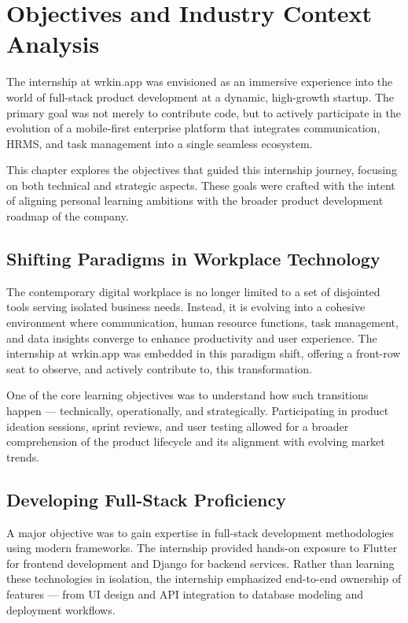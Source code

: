 \chapter{Objectives and Industry Context Analysis}

The internship at wrkin.app was envisioned as an immersive experience into the world of full-stack product development at a dynamic, high-growth startup. The primary goal was not merely to contribute code, but to actively participate in the evolution of a mobile-first enterprise platform that integrates communication, HRMS, and task management into a single seamless ecosystem. 

This chapter explores the objectives that guided this internship journey, focusing on both technical and strategic aspects. These goals were crafted with the intent of aligning personal learning ambitions with the broader product development roadmap of the company.

\section{Shifting Paradigms in Workplace Technology}

The contemporary digital workplace is no longer limited to a set of disjointed tools serving isolated business needs. Instead, it is evolving into a cohesive environment where communication, human resource functions, task management, and data insights converge to enhance productivity and user experience. The internship at wrkin.app was embedded in this paradigm shift, offering a front-row seat to observe, and actively contribute to, this transformation.

One of the core learning objectives was to understand how such transitions happen — technically, operationally, and strategically. Participating in product ideation sessions, sprint reviews, and user testing allowed for a broader comprehension of the product lifecycle and its alignment with evolving market trends.

\section{Developing Full-Stack Proficiency}

A major objective was to gain expertise in full-stack development methodologies using modern frameworks. The internship provided hands-on exposure to Flutter for frontend development and Django for backend services. Rather than learning these technologies in isolation, the internship emphasized end-to-end ownership of features — from UI design and API integration to database modeling and deployment workflows.

